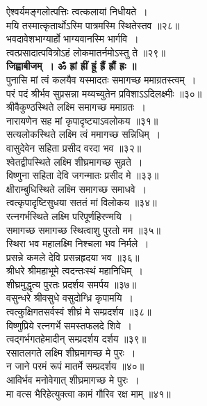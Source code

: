 \documentclass[twoside,top=1.7cm, bottom=1.7cm, outer=1cm,landscape, inner=1.5cm,a5paper,]{book}
\begin{document}
\begin{center}
ऐश्वर्यमङ्गलोत्पत्तिः त्वत्कलायां निधीयते~।\\
मयि तस्मात्कृतार्थोऽस्मि पात्रमस्मि स्थितेस्तव ॥२८॥\\[10pt]
\newpage
भवदावेशभाग्यार्हो भाग्यवानस्मि भार्गवि~।\\
त्वत्प्रसादात्पवित्रोऽहं लोकमातर्नमोऽस्तु ते ॥२९॥\\[10pt]
{\bfseries जिह्वाबीजम्~। ॐ ह्रां ह्रीं ह्रूं ह्रैं ह्रौं ह्रः ॥}\\[10pt]
पुनासि मां त्वं कलयैव यस्मादतः समागच्छ ममाग्रतस्त्वम्~।\\
परं पदं श्रीर्भव सुप्रसन्ना मय्यच्युतेन प्रविशाऽऽदिलक्ष्मीः ॥३०॥\\[10pt]
श्रीवैकुण्ठस्थिते लक्ष्मि समागच्छ ममाग्रतः~।\\
नारायणेन सह मां कृपादृष्ट्याऽवलोकय ॥३१॥\\[10pt]
सत्यलोकस्थिते लक्ष्मि त्वं ममागच्छ सन्निधिम्~।\\
वासुदेवेन सहिता प्रसीद वरदा भव ॥३२॥\\[10pt]
श्वेतद्वीपस्थिते लक्ष्मि शीघ्रमागच्छ सुव्रते~।\\
विष्णुना सहिता देवि जगन्मातः प्रसीद मे ॥३३॥\\[10pt]
क्षीराम्बुधिस्थिते लक्ष्मि समागच्छ समाधवे~।\\
त्वत्कृपादृष्टिसुधया सततं मां विलोकय ॥३४॥\\[10pt]
रत्नगर्भस्थिते लक्ष्मि परिपूर्णहिरण्मयि~।\\
समागच्छ समागच्छ स्थित्वाशु पुरतो मम ॥३५॥\\[10pt]
स्थिरा भव महालक्ष्मि निश्चला भव निर्मले~।\\
प्रसन्ने  कमले देवि प्रसन्नहृदया भव ॥३६॥\\[10pt]
\newpage
श्रीधरे श्रीमहाभूमे त्वदन्तःस्थं महानिधिम्~।\\
शीघ्रमुद्धृत्य पुरतः प्रदर्शय समर्पय ॥३७॥\\[10pt]
वसुन्धरे श्रीवसुधे वसुदोग्ध्रि कृपामयि~।\\
त्वत्कुक्षिगतसर्वस्वं शीघ्रं मे सम्प्रदर्शय ॥३८॥\\[10pt]
विष्णुप्रिये रत्नगर्भे समस्तफलदे शिवे~।\\
त्वद्गर्भगतहेमादीन् सम्प्रदर्शय दर्शय ॥३९॥\\[10pt]
रसातलगते लक्ष्मि शीघ्रमागच्छ मे पुरः~।\\
न जाने परमं रूपं मातर्मे सम्प्रदर्शय ॥४०॥\\[10pt]
\newpage
आविर्भव मनोवेगात् शीघ्रमागच्छ मे पुरः~।\\
मा वत्स भैरिहेत्युक्त्वा कामं गौरिव रक्ष माम् ॥४१॥\\[10pt]

\end{center}
\end{document}
